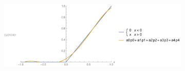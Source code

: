 \documentclass{article}
\begin{document}
\begin{figure}
\begin{subfigure}[b]{0.8\textwidth}
        \end{subfigure}
        \quad
        \begin{subfigure}[b]{0.8\textwidth}   
            \centering 
            \includegraphics[width=\textwidth]{part3_a4.pdf}
        \end{subfigure}
    \end{figure}
\end{document}
